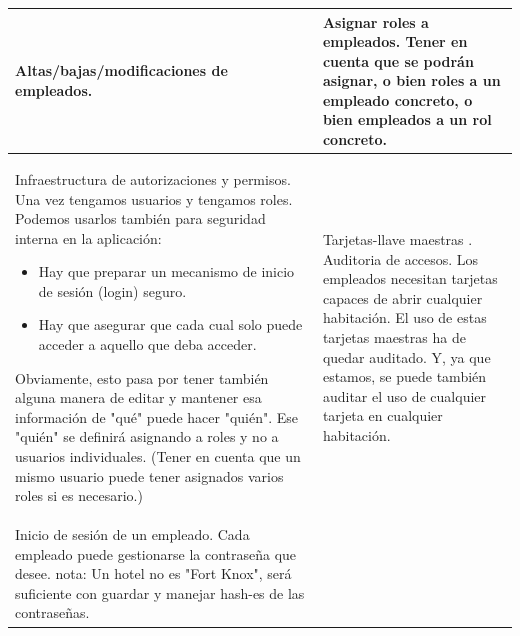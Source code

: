 \documentclass[spanish,12pt,a4paper,final,oneside]{book}
\begin{document}
\begin{longtable}{|p{7cm}|p{7cm}|}
\\ \hline

Altas/bajas/modificaciones de empleados.

& 

Asignar roles a empleados.
\newline \newline
Tener en cuenta que se podrán asignar, o bien roles a un empleado concreto, o bien empleados a un rol concreto.

\\ \hline

Infraestructura de autorizaciones y permisos.
\newline \newline
Una vez tengamos usuarios y tengamos roles. Podemos usarlos también para seguridad interna en la aplicación:
\begin{itemize}
\item Hay que preparar un mecanismo de inicio de sesión (login) seguro.
\item Hay que asegurar que cada cual solo puede acceder a aquello que deba acceder.
\end{itemize}
Obviamente, esto pasa por tener también alguna manera de editar y mantener esa información de "qué" puede hacer "quién". Ese "quién" se definirá asignando a roles y no a usuarios individuales.
\newline
(Tener en cuenta que un mismo usuario puede tener asignados varios roles si es necesario.)

&

Tarjetas-llave maestras . Auditoria de accesos.
\newline \newline
Los empleados necesitan tarjetas capaces de abrir cualquier habitación.
\newline
El uso de estas tarjetas maestras ha de quedar auditado. Y, ya que estamos, se puede también auditar el uso de cualquier tarjeta en cualquier habitación.

\\ \hline


Inicio de sesión de un empleado.
\newline \newline
Cada empleado puede gestionarse la contraseña que desee.
\newline
nota: Un hotel no es "Fort Knox", será suficiente con guardar y manejar hash-es de las contraseñas.

&


\end{longtable}
\end{document}

